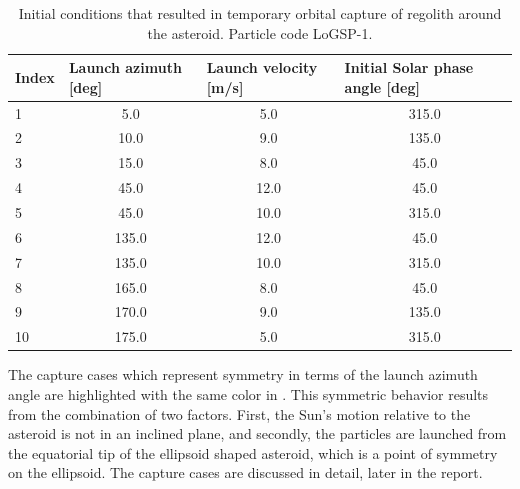 \begin{table}[htb]
\centering
\captionsetup{justification=centering}
\caption{Initial conditions that resulted in temporary orbital capture of regolith around the asteroid. Particle code LoGSP-1.}
\label{tab:LoGSP_1_capture}
\begin{tabular}{|l|c|c|c|}
\hline
Index & \multicolumn{1}{l|}{Launch azimuth [deg]} & \multicolumn{1}{l|}{Launch velocity [m/s]} & \multicolumn{1}{l|}{Initial Solar phase angle [deg]} \\ \hline
\rowcolor[HTML]{FE996B}
1   & 5.0 & 5.0 & 315.0     \\ \hline
\rowcolor[HTML]{67FD9A}
2   & 10.0 & 9.0 & 135.0    \\ \hline
\rowcolor[HTML]{9698ED}
3   & 15.0 & 8.0 & 45.0     \\ \hline
\rowcolor[HTML]{FFCC67}
4   & 45.0 & 12.0 & 45.0    \\ \hline
\rowcolor[HTML]{96FFFB}
5   & 45.0 & 10.0 & 315.0   \\ \hline
\rowcolor[HTML]{FFCC67}
6   & 135.0 & 12.0 & 45.0   \\ \hline
\rowcolor[HTML]{96FFFB}
7   & 135.0 & 10.0 & 315.0  \\ \hline
\rowcolor[HTML]{9698ED}
8   & 165.0 & 8.0 & 45.0    \\ \hline
\rowcolor[HTML]{67FD9A}
9   & 170.0 & 9.0 & 135.0   \\ \hline
\rowcolor[HTML]{FE996B}
10  & 175.0 & 5.0 & 315.0   \\ \hline
\end{tabular}
\end{table}
\FloatBarrier
The capture cases which represent symmetry in terms of the launch azimuth angle are highlighted with the same color in . This symmetric behavior results from the combination of two factors. First, the Sun's motion relative to the asteroid is not in an inclined plane, and secondly, the particles are launched from the equatorial tip of the ellipsoid shaped asteroid, which is a point of symmetry on the ellipsoid. The capture cases are discussed in detail, later in the report.
